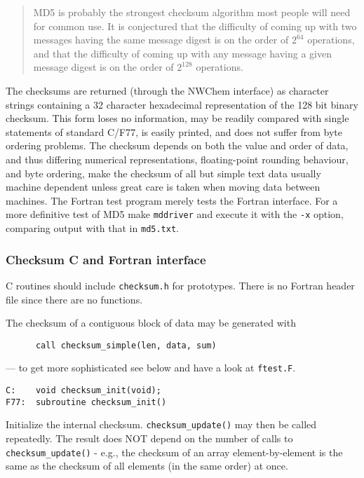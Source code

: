 \begin{quote}
MD5 is probably the strongest checksum algorithm most people will need
for common use.  It is conjectured that the difficulty of coming up
with two messages having the same message digest is on the order of
$2^{64}$ operations, and that the difficulty of coming up with any
message having a given message digest is on the order of $2^{128}$
operations.
\end{quote}

The checksums are returned (through the NWChem interface) as character
strings containing a 32 character hexadecimal representation of the
128 bit binary checksum.  This form loses no information, may be
readily compared with single statements of standard C/F77, is easily
printed, and does not suffer from byte ordering problems.  The
checksum depends on both the value and order of data, and thus
differing numerical representations, floating-point rounding
behaviour, and byte ordering, make the checksum of all but simple text
data usually machine dependent unless great care is taken when moving
data between machines.  The Fortran test program merely tests the
Fortran interface.  For a more definitive test of MD5 make
\verb+mddriver+ and execute it with the \verb+-x+ option, comparing
output with that in \verb+md5.txt+.

\subsubsection{Checksum C and Fortran interface}

C routines should include \verb+checksum.h+ for prototypes.
There is no Fortran header file since there are no functions.

The checksum of a contiguous block of data may be generated with 
\begin{verbatim}
      call checksum_simple(len, data, sum)
\end{verbatim}
--- to get more sophisticated see below and have a look at \verb+ftest.F+.

\begin{verbatim}
C:    void checksum_init(void);
F77:  subroutine checksum_init()
\end{verbatim}

  Initialize the internal checksum.  \verb+checksum_update()+ may then
  be called repeatedly.  The result does NOT depend on the number
  of calls to \verb+checksum_update()+ - e.g., the checksum of an array
  element-by-element is the same as the checksum of all elements 
  (in the same order) at once.

